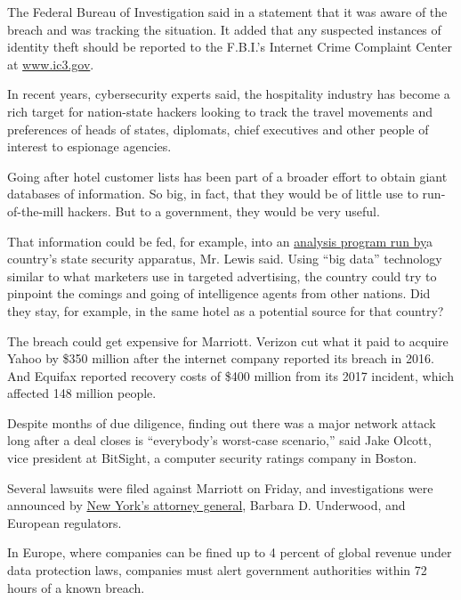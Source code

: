 The Federal Bureau of Investigation said in a statement that it was
aware of the breach and was tracking the situation. It added that any
suspected instances of identity theft should be reported to the F.B.I.'s
Internet Crime Complaint Center at
\href{https://www.google.com/url?q=http://www.ic3.gov\&sa=D\&source=hangouts\&ust=1543708313847000\&usg=AFQjCNEFY6mpufQ23K8VkSByfEN0fX59Jg}{www.ic3.gov}.

In recent years, cybersecurity experts said, the hospitality industry
has become a rich target for nation-state hackers looking to track the
travel movements and preferences of heads of states, diplomats, chief
executives and other people of interest to espionage agencies.

Going after hotel customer lists has been part of a broader effort to
obtain giant databases of information. So big, in fact, that they would
be of little use to run-of-the-mill hackers. But to a government, they
would be very useful.

That information could be fed, for example, into an
\href{https://www.nytimes.com/2018/11/29/us/politics/china-trump-cyberespionage.html}{analysis
program run by}a country's state security apparatus, Mr. Lewis said.
Using ``big data'' technology similar to what marketers use in targeted
advertising, the country could try to pinpoint the comings and going of
intelligence agents from other nations. Did they stay, for example, in
the same hotel as a potential source for that country?

The breach could get expensive for Marriott. Verizon cut what it paid to
acquire Yahoo by \$350 million after the internet company reported its
breach in 2016. And Equifax reported recovery costs of \$400 million
from its 2017 incident, which affected 148 million people.

Despite months of due diligence, finding out there was a major network
attack long after a deal closes is ``everybody's worst-case scenario,''
said Jake Olcott, vice president at BitSight, a computer security
ratings company in Boston.

Several lawsuits were filed against Marriott on Friday, and
investigations were announced by
\href{https://twitter.com/NewYorkStateAG/status/1068510072396029952}{New
York's attorney general}, Barbara D. Underwood, and European regulators.

In Europe, where companies can be fined up to 4 percent of global
revenue under data protection laws, companies must alert government
authorities within 72 hours of a known breach.

